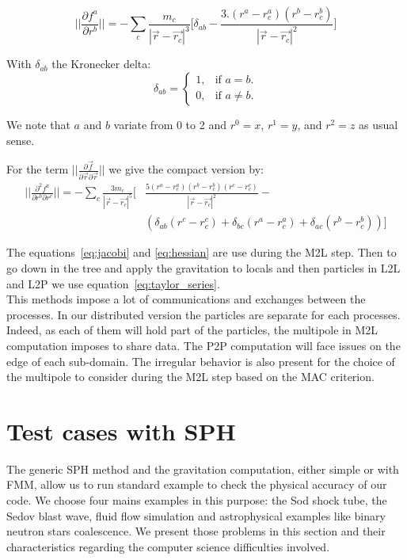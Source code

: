 \begin{equation}
 ||\frac{\partial f^a}{\partial r^b}|| = -\sum_c \frac{m_c}{|\vec{r}-\vec{r_c}|^3} \Big[ \delta_{ab} - \frac{3.(r^a-r_c^a)(r^b-r_c^b)}{|\vec{r}-\vec{r_c}|^2} \Big] 
 \label{eq:jacobi}
\end{equation}

With $\delta_{ab}$ the Kronecker delta:
\begin{equation}
\delta_{ab} = 
\begin{cases}
    1, & \text{if $a = b$}.\\
    0, & \text{if $a\neq b$}.
  \end{cases}
\end{equation}

We note that $a$ and $b$ variate from 0 to 2 and $r^0=x$, $r^1=y$, and $r^2=z$ as usual sense. 

For the term $||\frac{\partial\vec{f}}{\partial\vec{r} \partial\vec{r}}||$ we give the compact version by:
\begin{equation}
\begin{aligned}
||\frac{\partial^2 f^a}{\partial r^b \partial r^c}|| = - \sum_c \frac{3 m_c}{|\vec{r}-\vec{r_c}|^5} \Big[ & \frac{5(r^a-r_c^a)(r^b-r_c^b)(r^c-r_c^c)}{|\vec{r}-\vec{r_c}|^2} - \\ 
		 & \left( \delta_{ab} (r^c-r_c^c)+\delta_{bc} (r^a-r_c^a)+\delta_{ac} (r^b-r_c^b) \right) \Big] 
\end{aligned}
\label{eq:hessian}
\end{equation} 

The equations~\ref{eq:jacobi} and \ref{eq:hessian} are use during the M2L step. 
Then to go down in the tree and apply the gravitation to locals and then particles in L2L and L2P we use equation~\ref{eq:taylor_series}.\\

This methods impose a lot of communications and exchanges between the processes. 
In our distributed version the particles are separate for each processes. 
Indeed, as each of them will hold part of the particles, the multipole in M2L computation imposes to share data. 
The P2P computation will face issues on the edge of each sub-domain. 
The irregular behavior is also present for the choice of the multipole to consider during the M2L step based on the MAC criterion.

\section{Test cases with SPH} 
\label{sec:applications}
The generic SPH method and the gravitation computation, either simple or with FMM, allow us to run standard example to check the physical accuracy of our code. 
We choose four mains examples in this purpose: the Sod shock tube, the Sedov blast wave, fluid flow simulation and astrophysical examples like binary neutron stars coalescence.
We present those problems in this section and their characteristics regarding the computer science difficulties involved. 

